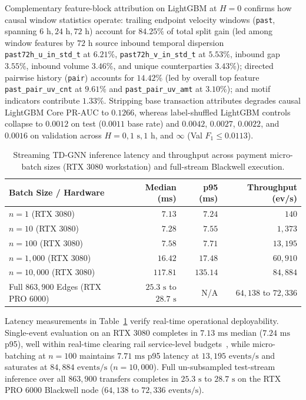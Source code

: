 \documentclass[pdflatex,sn-mathphys,Numbered]{sn-jnl}
\theoremstyle{thmstyleone}
\begin{document}
Complementary feature-block attribution on LightGBM at $H = 0$ confirms how causal window statistics operate: trailing endpoint velocity windows (\texttt{past}, spanning $6\text{ h}, 24\text{ h}, 72\text{ h}$) account for $84.25\%$ of total split gain (led among window features by $72\text{ h}$ source inbound temporal dispersion \texttt{past72h\_u\_in\_std\_t} at $6.21\%$, \texttt{past72h\_v\_in\_std\_t} at $5.53\%$, inbound gap $3.55\%$, inbound volume $3.46\%$, and unique counterparties $3.43\%$); directed pairwise history (\texttt{pair}) accounts for $14.42\%$ (led by overall top feature \texttt{past\_pair\_uv\_cnt} at $9.61\%$ and \texttt{past\_pair\_uv\_amt} at $3.10\%$); and motif indicators contribute $1.33\%$. Stripping base transaction attributes degrades causal LightGBM Core PR-AUC to $0.1266$, whereas label-shuffled LightGBM controls collapse to $0.0012$ on test ($0.0011$ base rate) and $0.0042$, $0.0027$, $0.0022$, and $0.0016$ on validation across $H = 0, 1\text{ s}, 1\text{ h}$, and $\infty$ (Val $F_1 \le 0.0113$).

\begin{table}[t]
\centering
\caption{Streaming TD-GNN inference latency and throughput across payment micro-batch sizes (RTX 3080 workstation) and full-stream Blackwell execution.}
\label{tab:service_latency}
\footnotesize
\setlength{\tabcolsep}{4pt}
\begin{tabular}{@{}lrrr@{}}
\toprule
\textbf{Batch Size / Hardware} & \textbf{Median (ms)} & \textbf{p95 (ms)} & \textbf{Throughput (ev/s)} \\
\midrule
$n = 1$ (RTX 3080) & $7.13$ & $7.24$ & $140$ \\
$n = 10$ (RTX 3080) & $7.28$ & $7.55$ & $1{,}373$ \\
$n = 100$ (RTX 3080) & $7.58$ & $7.71$ & $13{,}195$ \\
$n = 1{,}000$ (RTX 3080) & $16.42$ & $17.48$ & $60{,}910$ \\
$n = 10{,}000$ (RTX 3080) & $117.81$ & $135.14$ & $84{,}884$ \\
\midrule
Full $863{,}900$ Edges (RTX PRO 6000) & $25.3\text{ s}$ to $28.7\text{ s}$ & N/A & $64{,}138$ to $72{,}336$ \\
\bottomrule
\end{tabular}
\end{table}

Latency measurements in Table~\ref{tab:service_latency} verify real-time operational deployability. Single-event evaluation on an RTX 3080 completes in $7.13\text{ ms}$ median ($7.24\text{ ms}$ p95), well within real-time clearing rail service-level budgets~\cite{eu2024instant}, while micro-batching at $n = 100$ maintains $7.71\text{ ms}$ p95 latency at $13{,}195\text{ events/s}$ and saturates at $84{,}884\text{ events/s}$ ($n = 10{,}000$). Full un-subsampled test-stream inference over all $863{,}900$ transfers completes in $25.3\text{ s}$ to $28.7\text{ s}$ on the RTX PRO 6000 Blackwell node ($64{,}138$ to $72{,}336\text{ events/s}$).
\end{document}
